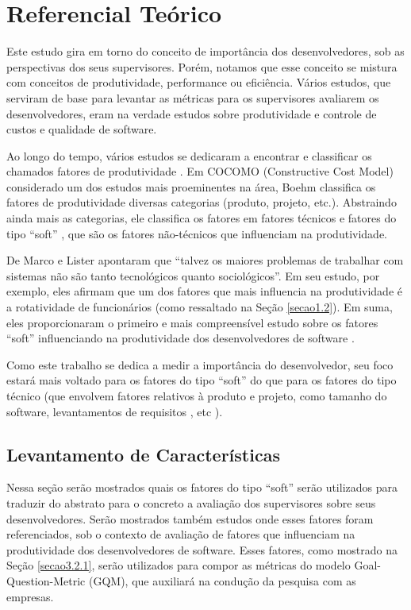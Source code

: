 \chapter[Referencial Teórico]{Referencial Teórico}

Este estudo gira em torno do conceito de importância dos desenvolvedores, sob as perspectivas dos seus supervisores. Porém, notamos que esse conceito se mistura com conceitos de produtividade, performance ou eficiência. Vários estudos, que serviram de base para levantar as métricas para os supervisores avaliarem os desenvolvedores, eram na verdade estudos sobre produtividade e controle de custos e qualidade de software.

Ao longo do tempo, vários estudos se dedicaram a encontrar e classificar os chamados fatores de produtividade \cite{Vosburgh1984, Walston1977,Brooks1981,Hanson1985,Jones1986,Boehm1988,Jones1997,Scudder1991,Banker1991,Boehm1984,Banker1987,Scacchi1995,Briand1998,Jones2000,Lokan2001,Clincy2003,Wagner2008,deBarrosSampaio2010}. Em COCOMO \cite{Boehm2000} (Constructive Cost Model) considerado um dos estudos mais proeminentes na área, Boehm classifica os fatores de produtividade diversas categorias (produto, projeto, etc.). Abstraindo ainda mais as categorias, ele classifica os fatores em fatores técnicos e fatores do tipo “soft” \cite{Wagner2008}, que são os fatores não-técnicos que influenciam na produtividade.

De Marco e Lister \cite{DeMarco1987} apontaram que “talvez os maiores problemas de trabalhar com sistemas não são tanto tecnológicos quanto sociológicos”. Em seu estudo, por exemplo, eles afirmam que um dos fatores que mais influencia na produtividade é a rotatividade de funcionários (como ressaltado na Seção \ref{secao1.2}). Em suma, eles proporcionaram o primeiro e mais compreensível estudo sobre os fatores “soft” influenciando na produtividade dos desenvolvedores de software \cite{Wagner2008}.

Como este trabalho se dedica a medir a importância do desenvolvedor, seu foco estará mais voltado para os fatores do tipo “soft” do que para os fatores do tipo técnico (que envolvem fatores relativos à produto e projeto, como tamanho do software, levantamentos de requisitos , etc \cite{deBarrosSampaio2010}).

\section{Levantamento de Características}\label{referencial_levantamento}
Nessa seção serão mostrados quais os fatores do tipo “soft” serão utilizados para traduzir do abstrato para o concreto a avaliação dos supervisores sobre seus desenvolvedores. Serão mostrados também estudos onde esses fatores foram referenciados, sob o contexto de avaliação de fatores que influenciam na produtividade dos desenvolvedores de software. Esses fatores, como mostrado na Seção \ref{secao3.2.1}, serão utilizados para compor as métricas do modelo Goal-Question-Metric (\acs{GQM}), que auxiliará na condução da pesquisa com as empresas. 

